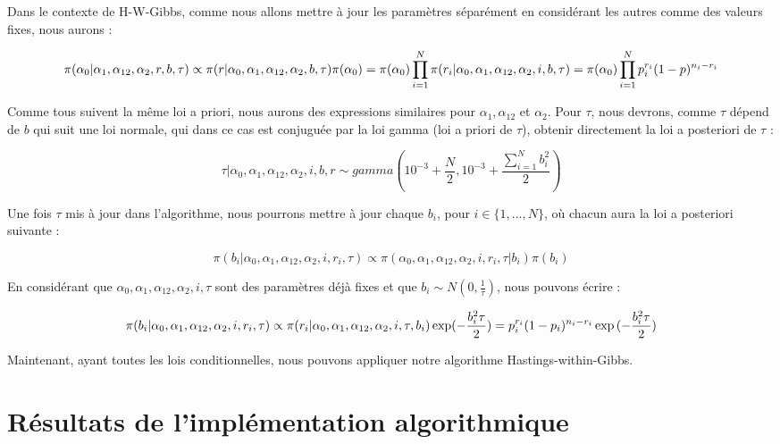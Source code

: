 \documentclass[
]{article}
\begin{document}
Dans le contexte de H-W-Gibbs, comme nous allons mettre à jour les
paramètres séparément en considérant les autres comme des valeurs fixes,
nous aurons :

\[
    \pi(\alpha_0|\alpha_1, \alpha_{12}, \alpha_2, r, b, \tau) \propto \pi(r|\alpha_0,\alpha_1, \alpha_{12}, \alpha_2, b, \tau)\pi(\alpha_0)\\ =  \pi(\alpha_0)\prod_{i=1}^N\pi(r_i|\alpha_0,\alpha_1, \alpha_{12}, \alpha_2, i,b, \tau)\\ = \pi(\alpha_0)\prod_{i=1}^Np_i^{r_i}(1-p)^{n_i - r_i}
\]

Comme tous suivent la même loi a priori, nous aurons des expressions
similaires pour \(\alpha_1, \alpha_{12}\) et \(\alpha_2\). Pour
\(\tau\), nous devrons, comme \(\tau\) dépend de \(b\) qui suit une loi
normale, qui dans ce cas est conjuguée par la loi gamma (loi a priori de
\(\tau\)), obtenir directement la loi a posteriori de \(\tau\) :

\[
  \tau|\alpha_0, \alpha_{1}, \alpha_{12},\alpha_2, i , b, r \sim gamma(10^{-3} + \frac{N}{2}, 10^{-3} + \frac{\sum_{i=1}^Nb_i^2}{2})
\]

Une fois \(\tau\) mis à jour dans l'algorithme, nous pourrons mettre à
jour chaque \(b_i\), pour \(i \in \{1, ..., N\}\), où chacun aura la loi
a posteriori suivante :

\[
  \pi(b_i| \alpha_0, \alpha_{1}, \alpha_{12},\alpha_2, i , r_i, \tau) \propto \pi( \alpha_0, \alpha_{1}, \alpha_{12},\alpha_2, i , r_i, \tau| b_i)\pi(b_i)
\]

En considérant que
\(\alpha_0, \alpha_{1}, \alpha_{12},\alpha_2, i, \tau\) sont des
paramètres déjà fixes et que \(b_i \sim N(0,\frac{1}{\tau})\), nous
pouvons écrire :

\[
  \pi(b_i| \alpha_0, \alpha_{1}, \alpha_{12},\alpha_2, i , r_i, \tau) \propto \pi(r_i|\alpha_0, \alpha_{1}, \alpha_{12},\alpha_2, i , \tau, b_i)\exp(-\frac{b_i^2\tau}{2}) \\
  =p_i^{r_i}(1-p_i)^{n_i-r_i}\exp{(-\frac{b_i^2\tau}{2})}
\]

Maintenant, ayant toutes les lois conditionnelles, nous pouvons
appliquer notre algorithme Hastings-within-Gibbs.

\hypertarget{ruxe9sultats-de-limpluxe9mentation-algorithmique}{%
\section{Résultats de l'implémentation
algorithmique}\label{ruxe9sultats-de-limpluxe9mentation-algorithmique}}
\end{document}
